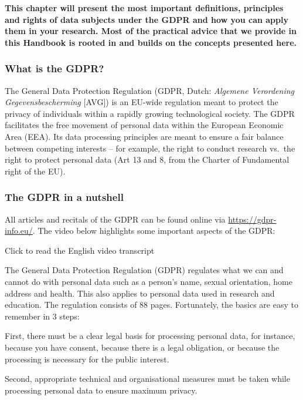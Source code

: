 \documentclass[
]{book}
\begin{document}
\textbf{This chapter will present the most important definitions, principles and rights of data subjects
under the GDPR and how you can apply them in your research. Most of the practical advice that we
provide in this Handbook is rooted in and builds on the concepts presented here.}

\hypertarget{what-is-the-gdpr}{%
\subsubsection{What is the GDPR?}\label{what-is-the-gdpr}}

The General Data Protection Regulation (GDPR, Dutch: \emph{Algemene Verordening Gegevensbescherming} {[}AVG{]})
is an EU-wide regulation meant to protect the privacy of individuals within a rapidly growing technological
society. The GDPR facilitates the free movement of personal data within the European Economic Area (EEA).
Its data processing principles are meant to ensure a fair balance between competing interests -- for example,
the right to conduct research vs.~the right to protect personal data (Art 13 and 8, from the Charter of
Fundamental right of the EU).

\hypertarget{the-gdpr-in-a-nutshell}{%
\subsubsection{The GDPR in a nutshell}\label{the-gdpr-in-a-nutshell}}

All articles and recitals of the GDPR can be found online via \url{https://gdpr-info.eu/}.
The video below highlights some important aspects of the GDPR:

Click to read the English video transcript

The General Data Protection Regulation (GDPR) regulates what we can and cannot do
with personal data such as a person's name, sexual orientation, home address and health.
This also applies to personal data used in research and education. The regulation consists
of 88 pages. Fortunately, the basics are easy to remember in 3 steps:

First, there must be a clear legal basis for processing personal data, for instance,
because you have consent, because there is a legal obligation, or because the processing is
necessary for the public interest.

Second, appropriate technical and organisational measures must be taken while processing
personal data to ensure maximum privacy.
\end{document}
